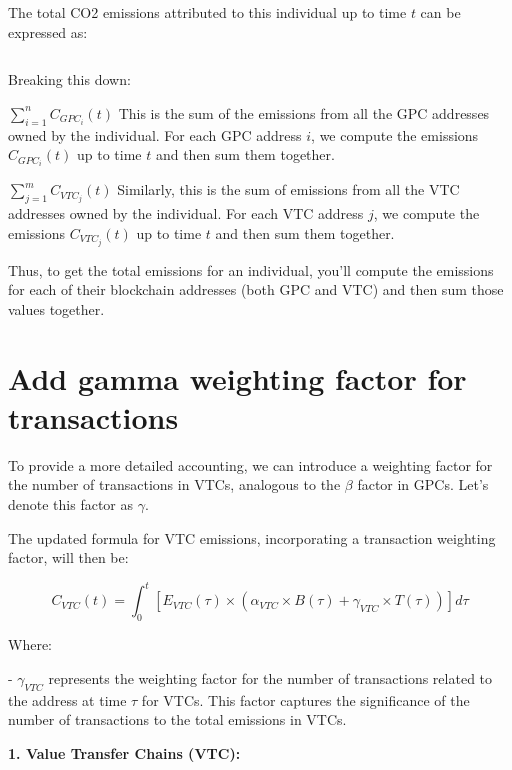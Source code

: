 \documentclass[12pt]{article}
\begin{document}
The total CO2 emissions attributed to this individual up to time \( t \) can be expressed as:

\begin{equation}
    [ C_{total}(t) = \sum_{i=1}^{n} C_{GPC_i}(t) + \sum_{j=1}^{m} C_{VTC_j}(t) ]
\end{equation}

Breaking this down: \\
\boldmath
\begin{description}
    \item \( \sum_{i=1}^{n} C_{GPC_i}(t) \) 
    This is the sum of the emissions from all the GPC addresses owned by the individual. For each GPC address \( i \), we compute the emissions \( C_{GPC_i}(t) \) up to time \( t \) and then sum them together.
    \item \( \sum_{j=1}^{m} C_{VTC_j}(t) \) 
    Similarly, this is the sum of emissions from all the VTC addresses owned by the individual. For each VTC address \( j \), we compute the emissions \( C_{VTC_j}(t) \) up to time \( t \) and then sum them together.

\end{description}
\unboldmath


Thus, to get the total emissions for an individual, you'll compute the emissions for each of their blockchain addresses (both GPC and VTC) and then sum those values together.

\section{Add gamma weighting factor for transactions}

To provide a more detailed accounting, we can introduce a weighting factor for the number of transactions in VTCs, analogous to the \( \beta \) factor in GPCs. Let's denote this factor as \( \gamma \).

The updated formula for VTC emissions, incorporating a transaction weighting factor, will then be:

\[ C_{VTC}(t) = \int_{0}^{t} [E_{VTC}(\tau) \times (\alpha_{VTC} \times B(\tau) + \gamma_{VTC} \times T(\tau))] d\tau \]

Where:

- \( \gamma_{VTC} \) represents the weighting factor for the number of transactions related to the address at time \( \tau \) for VTCs. This factor captures the significance of the number of transactions to the total emissions in VTCs.


\textbf{1. Value Transfer Chains (VTC):}
\end{document}
